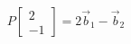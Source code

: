 \documentclass[preview]{standalone}
\begin{document}
\begin{align*}
P\begin{bmatrix}2\\-1\end{bmatrix} = 2\vec b_1-\vec b_2
\end{align*}
\end{document}
